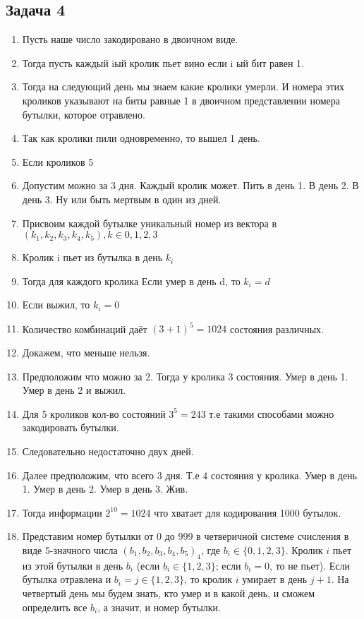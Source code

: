\documentclass[a4paper,12pt]{article}
\begin{document}
\subsection{Задача 4}
    \begin{enumerate}
        \item Пусть наше число закодировано в двоичном виде.
        \item Тогда пусть каждый iый кролик пьет вино если i ый бит равен 1.
        \item Тогда на следующий день мы знаем какие кролики умерли. И номера этих кроликов указывают на биты равные 1 в двоичном представлении номера бутылки, которое отравлено.
        \item Так как кролики пили одновременно, то вышел 1 день.
        \item Если кроликов 5
        \item Допустим можно за 3 дня. Каждый кролик может. Пить в день 1. В день 2. В день 3. Ну или быть мертвым в один из дней.
        \item Присвоим каждой бутылке уникальный номер из вектора в $(k_1, k_2, k_3, k_4, k_5), k \in {0, 1, 2, 3}$
        \item Кролик i пьет из бутылка в день $k_i$
        \item Тогда для каждого кролика Если умер в день d, то $k_i = d$
        \item Если выжил, то $k_i = 0$
        \item Количество комбинаций даёт $(3+1)^5=1024$ состояния различных.
        \item Докажем, что меньше нельзя.
        \item Предположим что можно за 2. Тогда у кролика 3 состояния. Умер в день 1. Умер в день 2 и выжил.
        \item Для 5 кроликов кол-во состояний $3^5=243$ т.е такими способами можно закодировать бутылки.
        \item Следовательно недостаточно двух дней.
        \item Далее предположим, что всего 3 дня. Т.е 4 состояния у кролика. Умер в день 1. Умер в день 2. Умер в день 3. Жив.
        \item Тогда информации $2^10=1024$ что хватает для кодирования 1000 бутылок.
        \item Представим номер бутылки от 0 до 999 в четверичной системе счисления в виде 5-значного числа $(b_1, b_2, b_3, b_4, b_5)_4$, где $b_i \in \{0, 1, 2, 3\}$. Кролик $i$ пьет из этой бутылки в день $b_i$ (если $b_i \in \{1, 2, 3\}$; если $b_i = 0$, то не пьет). Если бутылка отравлена и $b_i = j \in \{1, 2, 3\}$, то кролик $i$ умирает в день $j+1$. На четвертый день мы будем знать, кто умер и в какой день, и сможем определить все $b_i$, а значит, и номер бутылки.
    \end{enumerate}
\end{document}
